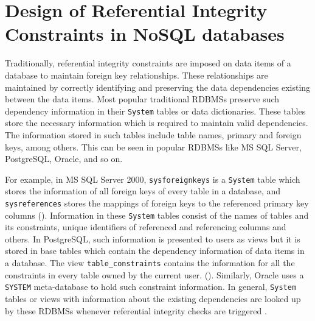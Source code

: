 \chapter{Design of Referential Integrity Constraints in NoSQL
databases} \label{c:solutions}

Traditionally,  referential
integrity constraints are imposed on data items of a database to maintain
foreign key relationships.  These relationships are
 maintained by correctly identifying and preserving the data dependencies 
 existing between the data items. 
Most popular traditional \acp{RDBMS}
preserve such dependency information in their \texttt{System} tables or data
dictionaries.   These tables store the necessary information  which is required
to maintain valid dependencies.  The information stored in such tables include table
names,   primary and foreign keys, among others. 
This can be seen in popular \acp{RDBMS} like  MS SQL Server,   PostgreSQL, 
Oracle,  and so on.   

For example,   in MS SQL Server 2000,  \texttt{sysforeignkeys}
is a \texttt{System} table which stores the information of all 
foreign keys of every table in a database,  and \texttt{sysreferences}
stores the mappings of  foreign keys to the referenced primary key columns
(). 
Information in these \texttt{System} tables consist of  the
names of tables and its constraints,   unique identifiers of 
referenced and referencing columns and others.  
In PostgreSQL,  such information is presented to users as views but it is stored
in base tables which contain the dependency information of data items in a database.
The view \texttt{table\_constraints} contains the information for all the
constraints in every table owned by the current user.  (\todo{\cite{}}).  
Similarly,  Oracle uses a \texttt{SYSTEM} meta-database to hold such constraint
information. 
 In general,  \texttt{System} tables or views with information
about the existing dependencies  are looked up by these \acp{RDBMS} whenever
referential integrity checks are triggered \citep{sys:msdn}. 


